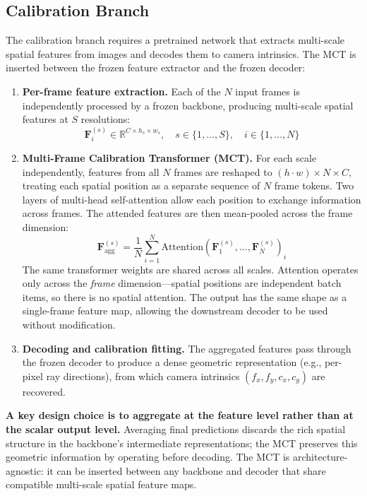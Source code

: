\subsection{Calibration Branch}\label{sec:calib-branch-generic}

The calibration branch requires a pretrained network that extracts multi-scale spatial features from images and decodes them to camera intrinsics. The MCT is inserted between the frozen feature extractor and the frozen decoder:

\begin{enumerate}
    \item \textbf{Per-frame feature extraction.} Each of the $N$ input frames is independently processed by a frozen backbone, producing multi-scale spatial features at $S$ resolutions:
    \begin{equation}
        \mathbf{F}_i^{(s)} \in \mathbb{R}^{C \times h_s \times w_s}, \quad s \in \{1,\ldots,S\}, \quad i \in \{1,\ldots,N\}
    \end{equation}

    \item \textbf{Multi-Frame Calibration Transformer (MCT).} For each scale independently, features from all $N$ frames are reshaped to $(h \cdot w) \times N \times C$, treating each spatial position as a separate sequence of $N$ frame tokens. Two layers of multi-head self-attention allow each position to exchange information across frames. The attended features are then mean-pooled across the frame dimension:
    \begin{equation}
        \mathbf{F}_{\text{agg}}^{(s)} = \frac{1}{N} \sum_{i=1}^{N} \text{Attention}(\mathbf{F}_1^{(s)}, \ldots, \mathbf{F}_N^{(s)})_i
    \end{equation}
    The same transformer weights are shared across all scales. Attention operates only across the \emph{frame} dimension---spatial positions are independent batch items, so there is no spatial attention. The output has the same shape as a single-frame feature map, allowing the downstream decoder to be used without modification.

    \item \textbf{Decoding and calibration fitting.} The aggregated features pass through the frozen decoder to produce a dense geometric representation (e.g., per-pixel ray directions), from which camera intrinsics $(f_x, f_y, c_x, c_y)$ are recovered.
\end{enumerate}

\textbf{A key design choice is to aggregate at the feature level rather than at the scalar output level.} Averaging final predictions discards the rich spatial structure in the backbone's intermediate representations; the MCT preserves this geometric information by operating before decoding. The MCT is architecture-agnostic: it can be inserted between any backbone and decoder that share compatible multi-scale spatial feature maps.

